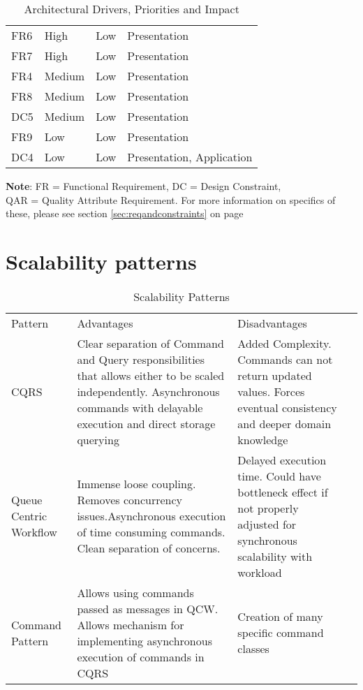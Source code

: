 \begin{table}[h]
\begin{tabularx}{\linewidth}{lllX}
\rowcolor[HTML]{CAF6C9} 
FR6 & High & Low & Presentation \\
\rowcolor[HTML]{CAF6C9} 
FR7 & High & Low & Presentation \\
\rowcolor[HTML]{CAF6C9} 
FR4 & Medium & Low & Presentation \\
\rowcolor[HTML]{CAF6C9} 
FR8 & Medium & Low & Presentation \\
\rowcolor[HTML]{CAF6C9} 
DC5 & Medium & Low & Presentation \\
\rowcolor[HTML]{CAF6C9} 
FR9 & Low & Low & Presentation \\
\rowcolor[HTML]{CAF6C9} 
DC4 & Low & Low & Presentation, Application
\end{tabularx}
\caption{Architectural Drivers, Priorities and Impact}
\label{table:architecturaldrivers}
\end{table}
\begin{center}
\textbf{Note}: FR = Functional Requirement, DC = Design Constraint, \\ QAR = Quality Attribute Requirement. For more information on specifics of these, please see section \ref{sec:reqandconstraints} on page~\pageref{sec:reqandconstraints}
\end{center}
\newpage


\section{Scalability patterns}
\begin{table}[h]
\centering
\begin{tabularx}{\textwidth}{|p{2cm}|X|X|l}
\cline{1-3}
\cellcolor[HTML]{EFEFEF}Pattern & \cellcolor[HTML]{EFEFEF}Advantages & \cellcolor[HTML]{EFEFEF}Disadvantages &  \\ \cline{1-3}
CQRS & Clear separation of Command and Query responsibilities that allows either to be scaled independently. Asynchronous commands with delayable execution and direct storage querying & Added Complexity. Commands can not return updated values. Forces eventual consistency and deeper domain knowledge &  \\ \cline{1-3}
Queue Centric Workflow & Immense loose coupling.  Removes concurrency issues.Asynchronous execution of time consuming commands. Clean separation of concerns. & Delayed execution time. Could have bottleneck effect if not properly adjusted for synchronous  scalability with workload &  \\ \cline{1-3}
Command Pattern & Allows using commands passed as messages in QCW. Allows mechanism for implementing asynchronous execution of commands in CQRS & Creation of many specific command classes &  \\ \cline{1-3}
\end{tabularx}
\caption{Scalability Patterns}
\label{tab:scalability_patterns}
\end{table}

